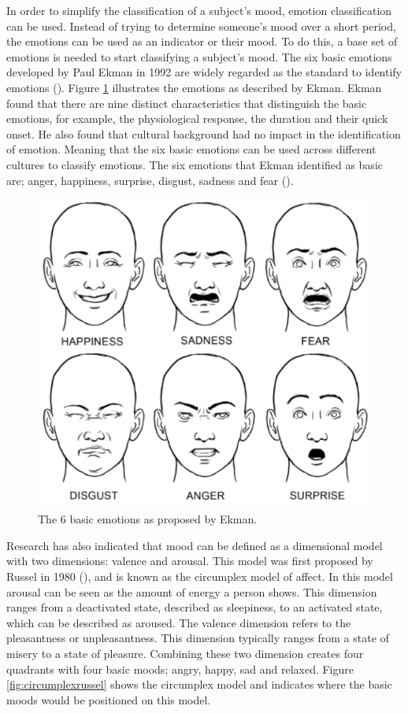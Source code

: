 In order to simplify the classification of a subject's mood, emotion classification can be used. Instead of trying to determine someone's mood over a short period, the emotions can be used as an indicator or their mood. To do this, a base set of emotions is needed to start classifying a subject's mood. The six basic emotions developed by Paul Ekman in 1992 are widely regarded as the standard to identify emotions (\cite{ekman1992argument}). Figure \ref{fig:basicemotion} illustrates the emotions as described by Ekman. Ekman found that there are nine distinct characteristics that distinguish the basic emotions, for example, the physiological response, the duration and their quick onset. He also found that cultural background had no impact in the identification of emotion. Meaning that the six basic emotions can be used across different cultures to classify emotions. The six emotions that Ekman identified as basic are; anger, happiness, surprise, disgust, sadness and fear (\cite{ekman1992argument}). 

\begin{figure}[h]
  \centering
  \includegraphics[width=\columnwidth]{Images/ekman_six_emotion.png}
  \caption{The 6 basic emotions as proposed by Ekman.}
  \label{fig:basicemotion}
\end{figure}

Research has also indicated that mood can be defined as a dimensional model with two dimensions: valence and arousal. This model was first proposed by Russel in 1980 (\cite{russell1980circumplex}), and is known as the circumplex model of affect. In this model arousal can be seen as the amount of energy a person shows. This dimension ranges from a deactivated state, described as sleepiness, to an activated state, which can be described as aroused. The valence dimension refers to the pleasantness or unpleasantness. This dimension typically ranges from a state of misery to a state of pleasure. Combining these two dimension creates four quadrants with four basic moods; angry, happy, sad and relaxed. Figure \ref{fig:circumplexrussel} shows the circumplex model and indicates where the basic moods would be positioned on this model.

